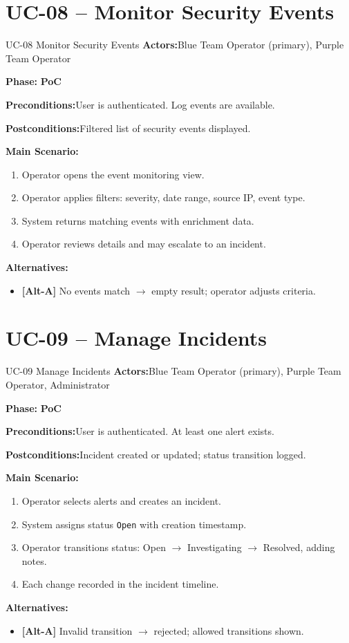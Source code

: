 \documentclass[12pt,a4paper]{report}
\newcommand{\ucfield}[2]{%
    \noindent\textbf{\color{helixpurplemid}#1:}\quad #2\par\medskip
}
\newcommand{\ucphase}[1]{%
    \noindent\textbf{\color{helixpurplemid}Phase:}\quad%
    \ifstrequal{#1}{PoC}{\textcolor{helixteal}{\textbf{PoC}}}{\textcolor{helixamber}{\textbf{Future MVP}}}%
    \par\medskip
}
\begin{document}
\section{UC-08 -- Monitor Security Events}
\begin{ucbox}{UC-08 \quad Monitor Security Events}
    \ucfield{Actors}{Blue Team Operator (primary), Purple Team Operator}
    \ucphase{PoC}
    \ucfield{Preconditions}{User is authenticated. Log events are available.}
    \ucfield{Postconditions}{Filtered list of security events displayed.}
    \textbf{\color{helixpurplemid}Main Scenario:}
    \begin{enumerate}
        \item Operator opens the event monitoring view.
        \item Operator applies filters: severity, date range, source IP, event type.
        \item System returns matching events with enrichment data.
        \item Operator reviews details and may escalate to an incident.
    \end{enumerate}
    \textbf{\color{helixpurplemid}Alternatives:}
    \begin{itemize}
        \item \textbf{[Alt-A]} No events match $\rightarrow$ empty result; operator adjusts criteria.
    \end{itemize}
\end{ucbox}

\section{UC-09 -- Manage Incidents}
\begin{ucbox}{UC-09 \quad Manage Incidents}
    \ucfield{Actors}{Blue Team Operator (primary), Purple Team Operator, Administrator}
    \ucphase{PoC}
    \ucfield{Preconditions}{User is authenticated. At least one alert exists.}
    \ucfield{Postconditions}{Incident created or updated; status transition logged.}
    \textbf{\color{helixpurplemid}Main Scenario:}
    \begin{enumerate}
        \item Operator selects alerts and creates an incident.
        \item System assigns status \texttt{Open} with creation timestamp.
        \item Operator transitions status: Open $\rightarrow$ Investigating $\rightarrow$ Resolved, adding notes.
        \item Each change recorded in the incident timeline.
    \end{enumerate}
    \textbf{\color{helixpurplemid}Alternatives:}
    \begin{itemize}
        \item \textbf{[Alt-A]} Invalid transition $\rightarrow$ rejected; allowed transitions shown.
    \end{itemize}
\end{ucbox}
\end{document}
